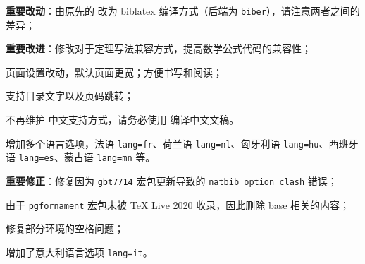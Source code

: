 \documentclass[lang=cn,10pt]{elegantbook}
\begin{document}

\begin{change}
  \item \textbf{重要改动}：由原先的  改为 biblatex 编译方式（后端为 \lstinline{biber}），请注意两者之间的差异；
  \item \textbf{重要改进}：修改对于定理写法兼容方式，提高数学公式代码的兼容性；
  \item 页面设置改动，默认页面更宽；方便书写和阅读；
  \item 支持目录文字以及页码跳转；
  \item 不再维护  中文支持方式，请务必使用  编译中文文稿。
  \item 增加多个语言选项，法语 \lstinline{lang=fr}、荷兰语 \lstinline{lang=nl}、匈牙利语 \lstinline{lang=hu}、西班牙语 \lstinline{lang=es}、蒙古语 \lstinline{lang=mn} 等。
\end{change}



\begin{change}
  \item \textbf{重要修正}：修复因为 \lstinline{gbt7714} 宏包更新导致的 \lstinline{natbib option clash} 错误；
  \item 由于 \lstinline{pgfornament} 宏包未被 \TeX{} Live 2020 收录，因此删除 base 相关的内容；
  \item 修复部分环境的空格问题；
  \item 增加了意大利语言选项 \lstinline{lang=it}。
\end{change}


\end{document}
